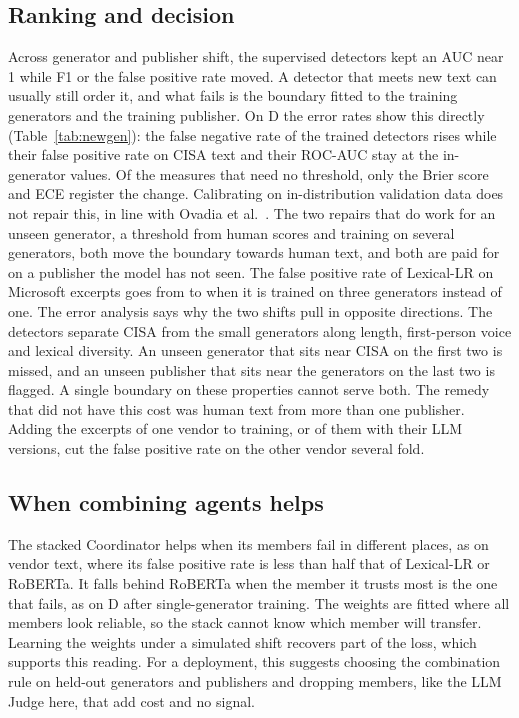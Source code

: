 \documentclass[journal]{IEEEtran}
\begin{document}
\subsection{Ranking and decision}
Across generator and publisher shift, the supervised detectors kept an AUC near 1 while F1 or the false positive
rate moved. A detector that meets new text can usually still order it, and what fails is the boundary fitted to
the training generators and the training publisher. On D the error rates show this directly
(Table~\ref{tab:newgen}): the false negative rate of the trained detectors rises while their false positive rate
on CISA text and their ROC-AUC stay at the in-generator values. Of the measures that need no threshold, only the
Brier score and ECE register the change. Calibrating on in-distribution validation data does not repair
this, in line with Ovadia et al.\ \cite{Ovadia_2019}. The two repairs that do work for an unseen generator, a
threshold from human scores and training on several generators, both move the boundary towards human text, and
both are paid for on a publisher the model has not seen. The false positive rate of Lexical-LR on Microsoft
excerpts goes from \PoolfprOneMicrosoftLexlr{} to \PoolfprThreeMicrosoftLexlr{} when it is trained on three
generators instead of one. The error analysis says why the two shifts pull in opposite directions. The detectors separate CISA from
the small generators along length, first-person voice and lexical diversity. An unseen generator that sits near
CISA on the first two is missed, and an unseen publisher that sits near the generators on the last two is flagged.
A single boundary on these properties cannot serve both. The remedy that did not have this cost was human text
from more than one publisher. Adding the excerpts of one vendor to training, \NExtChunksMicrosoft{} or
\NExtChunksMandiant{} of them with their LLM versions, cut the false positive rate on the other vendor several
fold.

\subsection{When combining agents helps}
The stacked Coordinator helps when its members fail in different places, as on vendor text, where its false
positive rate is less than half that of Lexical-LR or RoBERTa. It falls behind RoBERTa when the member it trusts
most is the one that fails, as on D after single-generator training. The weights are fitted where all members look
reliable, so the stack cannot know which member will transfer. Learning the weights under a simulated shift
recovers part of the loss, which supports this reading. For a deployment, this suggests choosing the combination
rule on held-out generators and publishers and dropping members, like the LLM Judge here, that add cost and no
signal.
\end{document}
